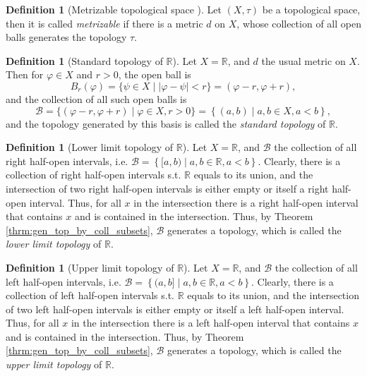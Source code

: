 \documentclass[12pt, a4paper]{article}
\numberwithin{equation}{section}
\theoremstyle{definition}
\theoremstyle{definition}
\newtheorem{defn}[thm]{Definition} %
\newcommand{\abs}[1]{\left\vert #1 \right\vert}
\begin{document}
		\begin{defn}[Metrizable topological space \cite{topology-singh}]
			Let $(X, \tau)$ be a topological space, then it is called \textit{metrizable} if there is a metric $d$ on $X$, whose collection of all open balls generates the topology $\tau$.
		\end{defn}

		\begin{defn}[Standard topology of $\mathbb R$]\label{defn:standard_topology}
			Let $X = \mathbb R$, and $d$ the usual metric on $X$. Then for $\varphi\in X$ and $r > 0$, the open ball is $$B_{r}(\varphi) = \{ \psi\in X\mid \abs{\varphi - \psi} < r \} = (\varphi - r, \varphi + r),$$ and the collection of all such open balls is $$\mathscr B = \{(\varphi - r, \varphi + r) \mid \varphi\in X, r > 0\} = \left\{(a, b) \mid a, b\in X, a < b\right\},$$
			and the topology generated by this basis is called the \textit{standard topology} of $\mathbb R$.
		\end{defn}
	
		\begin{defn}[Lower limit topology of $\mathbb R$]
			Let $X = \mathbb R$, and $\mathscr B$ the collection of all right half-open intervals, i.e. $\mathscr B= \left\{ [a, b) \mid a, b\in\mathbb R, a < b \right\}$. Clearly, there is a collection of right half-open intervals s.t. $\mathbb R$ equals to its union, and the intersection of two right half-open intervals is either empty or itself a right half-open interval. Thus, for all $x$ in the intersection there is a right half-open interval that contains $x$ and is contained in the intersection. Thus, by Theorem \ref{thrm:gen_top_by_coll_subsets}, $\mathscr B$ generates a topology, which is called the \textit{lower limit topology} of $\mathbb R$.
		\end{defn}
	
		\begin{defn}[Upper limit topology of $\mathbb R$]
			Let $X = \mathbb R$, and $\mathscr B$ the collection of all left half-open intervals, i.e. $\mathscr B= \left\{ (a, b] \mid a, b\in\mathbb R, a < b \right\}$. Clearly, there is a collection of left half-open intervals s.t. $\mathbb R$ equals to its union, and the intersection of two left half-open intervals is either empty or itself a left half-open interval. Thus, for all $x$ in the intersection there is a left half-open interval that contains $x$ and is contained in the intersection. Thus, by Theorem \ref{thrm:gen_top_by_coll_subsets}, $\mathscr B$ generates a topology, which is called the \textit{upper limit topology} of $\mathbb R$.
		\end{defn}
	
\end{document}
